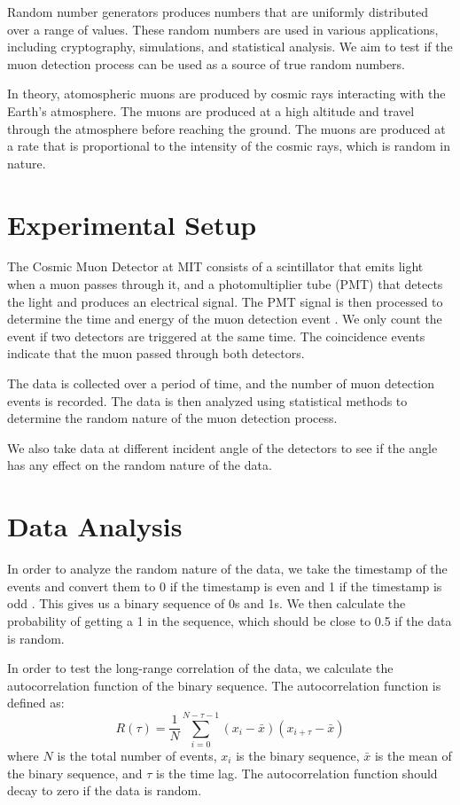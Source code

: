 Random number generators produces numbers that are uniformly distributed over a range of values. These random numbers are used in various applications, including cryptography, simulations, and statistical analysis. We aim to test if the muon detection process can be used as a source of true random numbers. 

In theory, atomospheric muons are produced by cosmic rays interacting with the Earth's atmosphere. The muons are produced at a high altitude and travel through the atmosphere before reaching the ground. The muons are produced at a rate that is proportional to the intensity of the cosmic rays, which is random in nature. 

\section{Experimental Setup}
The Cosmic Muon Detector at MIT consists of a scintillator that emits light when a muon passes through it, and a photomultiplier tube (PMT) that detects the light and produces an electrical signal. The PMT signal is then processed to determine the time and energy of the muon detection event \cite{axani2024cosmicwatch}. We only count the event if two detectors are triggered at the same time. The coincidence events indicate that the muon passed through both detectors. 

The data is collected over a period of time, and the number of muon detection events is recorded. The data is then analyzed using statistical methods to determine the random nature of the muon detection process.

We also take data at different incident angle of the detectors to see if the angle has any effect on the random nature of the data. 

\section{Data Analysis}
In order to analyze the random nature of the data, we take the timestamp of the events and convert them to 0 if the timestamp is even and 1 if the timestamp is odd \cite{axani2024cosmicwatch}. This gives us a binary sequence of 0s and 1s. We then calculate the probability of getting a 1 in the sequence, which should be close to 0.5 if the data is random. 

In order to test the long-range correlation of the data, we calculate the autocorrelation function of the binary sequence. The autocorrelation function is defined as:
\begin{equation}
R(\tau) = \frac{1}{N} \sum_{i=0}^{N-\tau-1} (x_i - \bar{x})(x_{i+\tau} - \bar{x})
\end{equation}
where $N$ is the total number of events, $x_i$ is the binary sequence, $\bar{x}$ is the mean of the binary sequence, and $\tau$ is the time lag. The autocorrelation function should decay to zero if the data is random.

